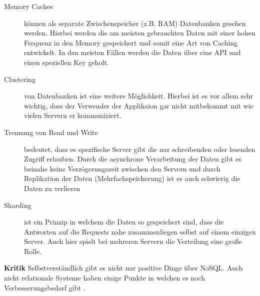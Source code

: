 \begin{description}
	\item[Memory Caches] können als separate Zwischenspeicher (z.B. RAM) Datenbanken gesehen werden. Hierbei werden die am meisten gebrauchten Daten mit einer hohen Frequenz in den Memory gespeichert und somit eine Art von Caching entwickelt. In den meisten Fällen werden die Daten über eine API und einen speziellen Key geholt.

	\item[Clustering] von Datenbanken ist eine weitere Möglichkeit. Hierbei ist es vor allem sehr wichtig, dass der Verwender der Applikaion gar nicht mitbekommt mit wie vielen Servern er kommuniziert.

	\item[Trennung von Read und Write] bedeutet, dass es spezifische Server gibt die nur schreibenden oder lesenden Zugriff erlauben. Durch die asynchrone Verarbeitung der Daten gibt es beinahe keine Verzögerungszeit zwischen den Servern und durch Replikation der Daten (Mehrfachspeicherung) ist es auch schwierig die Daten zu verlieren

	\item[Sharding] ist ein Prinzip in welchem die Daten so gespeichert sind, dass die Antworten auf die Requests nahe zusammenliegen selbst auf einem einzigen Server. Auch hier spielt bei mehreren Servern die Verteilung eine große Rolle.
\end{description}

\textbf{Kritik\newline}
Selbstverständlich gibt es nicht nur positive Dinge über NoSQL. Auch nicht relationale Systeme haben einige Punkte in welchen es noch Verbesserungsbedarf gibt \cite{MELD.CH2-noSQL.sqlvsnosql}. 

